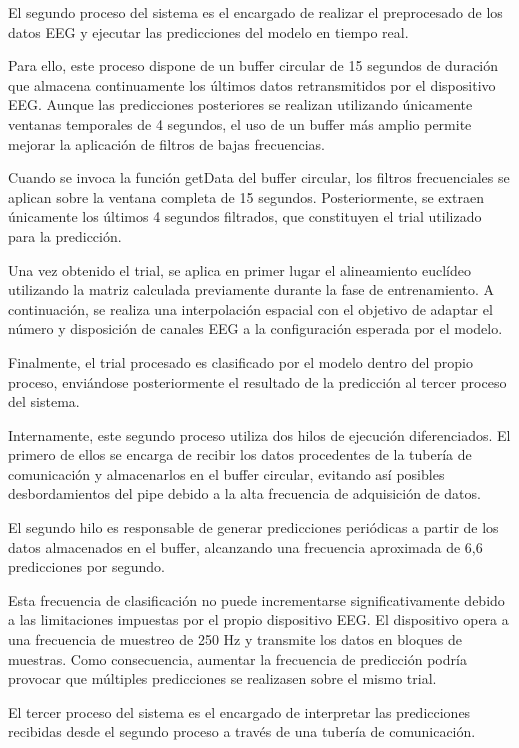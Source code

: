 El segundo proceso del sistema es el encargado de realizar el preprocesado de los datos EEG y ejecutar las predicciones del modelo en tiempo real.

Para ello, este proceso dispone de un buffer circular de 15 segundos de duración que almacena continuamente los últimos datos retransmitidos por el dispositivo EEG. Aunque las predicciones posteriores se realizan utilizando únicamente ventanas temporales de 4 segundos, el uso de un buffer más amplio permite mejorar la aplicación de filtros de bajas frecuencias.

Cuando se invoca la función getData del buffer circular, los filtros frecuenciales se aplican sobre la ventana completa de 15 segundos. Posteriormente, se extraen únicamente los últimos 4 segundos filtrados, que constituyen el trial utilizado para la predicción.

Una vez obtenido el trial, se aplica en primer lugar el alineamiento euclídeo utilizando la matriz calculada previamente durante la fase de entrenamiento. A continuación, se realiza una interpolación espacial con el objetivo de adaptar el número y disposición de canales EEG a la configuración esperada por el modelo.

Finalmente, el trial procesado es clasificado por el modelo dentro del propio proceso, enviándose posteriormente el resultado de la predicción al tercer proceso del sistema.

Internamente, este segundo proceso utiliza dos hilos de ejecución diferenciados. El primero de ellos se encarga de recibir los datos procedentes de la tubería de comunicación y almacenarlos en el buffer circular, evitando así posibles desbordamientos del pipe debido a la alta frecuencia de adquisición de datos.

El segundo hilo es responsable de generar predicciones periódicas a partir de los datos almacenados en el buffer, alcanzando una frecuencia aproximada de 6,6 predicciones por segundo.

Esta frecuencia de clasificación no puede incrementarse significativamente debido a las limitaciones impuestas por el propio dispositivo EEG. El dispositivo opera a una frecuencia de muestreo de 250 Hz y transmite los datos en bloques de muestras. Como consecuencia, aumentar la frecuencia de predicción podría provocar que múltiples predicciones se realizasen sobre el mismo trial.

El tercer proceso del sistema es el encargado de interpretar las predicciones recibidas desde el segundo proceso a través de una tubería de comunicación.

